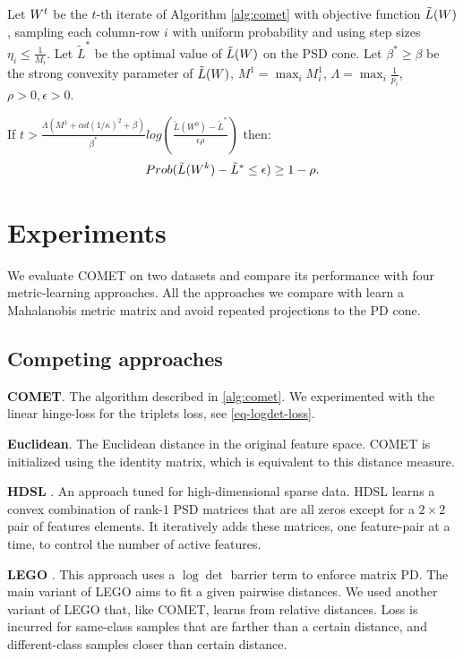 \documentclass{article}
\begin{document}
\begin{theorem}
Let ${W}^t$ be the $t$-th iterate of Algorithm \ref{alg:comet} with objective function $\tilde{L}({W})$, sampling each column-row $i$ with uniform probability and using step sizes $\eta_i \leq \frac{1}{M_i}$. Let $\tilde{L}^*$ be the optimal value of $\tilde{L}({W})$ on the PSD cone. Let $\beta^* \geq \beta$ be the strong convexity parameter of $\tilde{L}({W})$, $M^1 = \max_i M^1_i$, $\Lambda = \max_i \frac{1}{p_i}$, $\rho >0, \epsilon>0$.

If $t > \frac{\Lambda (M^1 + \alpha d (1/\kappa)^2 + \beta)}{\beta^*} log \left( \frac{\tilde{L}(W^0) - \tilde{L}^*}{\epsilon \rho}\right)$ then: $$Prob(\tilde{L}({W}^k) - \tilde{L}^* \leq \epsilon) \geq 1-\rho.$$
\end{theorem}


\section{Experiments}
We evaluate COMET on two datasets and compare its performance with four metric-learning approaches. All the approaches we compare with learn a Mahalanobis metric matrix and avoid repeated projections to the PD cone. 


\subsection{Competing approaches}

\textbf{COMET}. The algorithm described in \ref{alg:comet}. We experimented with the linear hinge-loss for the triplets loss, see \eqref{eq-logdet-loss}.

\textbf{Euclidean}. The Euclidean distance in the original feature space. COMET is initialized using the identity matrix, which is equivalent to this distance measure.

\textbf{HDSL} \cite{hdsl}. An approach tuned for high-dimensional sparse data. HDSL learns a convex combination of rank-1 PSD matrices that are all zeros except for a $2\times2$ pair of features elements. It iteratively adds these matrices, one feature-pair at a time, to control the number of active features.

\textbf{LEGO} \cite{lego}. This approach uses a $\log \det$ barrier term to enforce matrix PD. The main variant of LEGO aims to fit a given pairwise distances. We used another variant of LEGO that, like COMET, learns from relative distances. Loss is incurred for same-class samples that are farther than a certain distance, and different-class samples closer than certain distance.
\end{document}
